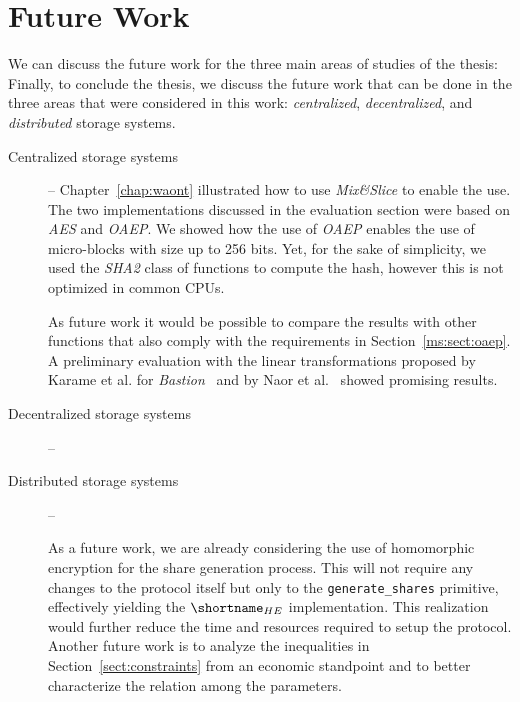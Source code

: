 {	

\section{Future Work}

We can discuss the future work for the three main areas of studies of the thesis: 
Finally, to conclude the thesis, we discuss the future work that can be done in the three areas that were considered in this work: \textit{centralized}, \textit{decentralized}, and \textit{distributed} storage systems.

\begin{description}
	
	\item[Centralized storage systems] -- Chapter~\ref{chap:waont} illustrated how to use {\em Mix\&Slice} to enable the use. The two implementations discussed in the evaluation section were based on \textit{AES} and \textit{OAEP}. We showed how the use of \textit{OAEP} enables the use of micro-blocks with size up to 256 bits. Yet, for the sake of simplicity, we used the 	 \textit{SHA2} class of functions to compute the hash, however this is not optimized in common CPUs.
	
	As future work it would be possible to compare the results with other functions that also comply with the requirements in Section~\ref{ms:sect:oaep}. A preliminary evaluation with the linear transformations proposed by Karame et al. for \textit{Bastion}~\cite{bastion} and by Naor et al.~\cite{Naor1999} showed promising results.
	
	\item[Decentralized storage systems] -- 
	
	\item[Distributed storage systems] --

		As a future work, we are already considering the use of homomorphic encryption for the share generation process. This will not require any changes to the protocol itself but only to the \texttt{generate\_shares} primitive, effectively yielding the $\shortname_{HE}$ implementation. This realization would further reduce the time and resources required to setup the \shortname protocol.
		Another future work is to analyze the inequalities in Section~\ref{sect:constraints} from an economic standpoint and to better characterize the relation among the parameters.
	
\end{description}

}